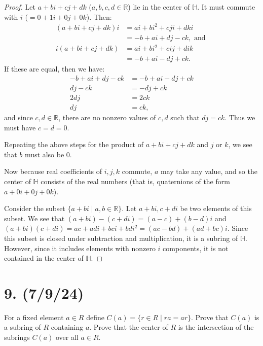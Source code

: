 \documentclass{article}
\begin{document}
\begin{proof}
    Let $a + bi + cj + dk$ ($a, b, c, d \in \mathbb{R}$) lie in the center of $\mathbb{H}$. It must commute with $i$ ($= 0 + 1i + 0j + 0k$). Then:
    \begin{align*}
        (a + bi + cj + dk)i &= ai + bi^2 + cji + dki \\
        &= -b + ai + dj - ck, \text{ and } \\
        i(a + bi + cj + dk) &= ai + bi^2 + cij + dik \\
        &= -b + ai - dj + ck.
    \end{align*}
    If these are equal, then we have:
    \begin{align*}
        -b + ai + dj - ck &= -b + ai - dj + ck \\
        dj - ck &= -dj + ck \\ 
        2dj &= 2ck \\
        dj &= ck,
    \end{align*}
    and since $c, d \in \mathbb{R}$, there are no nonzero values of $c, d$ such that $dj = ck$. Thus we must have $c = d = 0$.

    Repeating the above steps for the product of $a + bi + cj + dk$ and $j$ or $k$, we see that $b$ must also be 0.

    Now because real coefficients of $i, j, k$ commute, $a$ may take any value, and so the center of $\mathbb{H}$ consists of the real numbers (that is, quaternions of the form $a + 0i + 0j + 0k$).

    Consider the subset $\{ a + bi \mid a, b \in \mathbb{R} \}$. Let $a + bi, c + di$ be two elements of this subset. We see that $(a + bi) - (c + di) = (a - c) + (b - d)i$ and $(a + bi)(c + di) = ac + adi + bci + bdi^2 = (ac - bd) + (ad + bc)i$. Since this subset is closed under subtraction and multiplication, it is a subring of $\mathbb{H}$. However, since it includes elements with nonzero $i$ components, it is not contained in the center of $\mathbb{H}$.
\end{proof}

\section*{9. (7/9/24)}

For a fixed element $a \in R$ define $C(a) = \{ r \in R \mid ra = ar \}$. Prove that $C(a)$ is a subring of $R$ containing $a$. Prove that the center of $R$ is the intersection of the subrings $C(a)$ over all $a \in R$.
\end{document}
